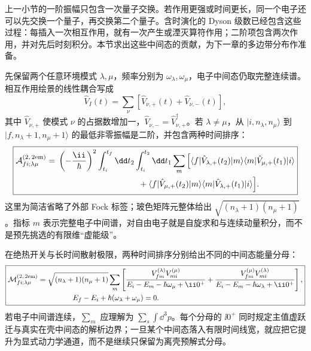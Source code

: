 上一小节的一阶振幅只包含一次量子交换。若作用更强或时间更长，同一个电子还可以先交换一个量子，再交换第二个量子。含时演化的 Dyson 级数已经包含这些过程：每插入一次相互作用，就有一次产生或湮灭算符作用；二阶项包含两次作用，并对先后时刻积分。本节求出这些中间态的贡献，为下一章的多边带分布作准备。

先保留两个任意环境模式 $\lambda,\mu$，频率分别为 $\omega_\lambda,\omega_\mu$，电子中间态仍取完整连续谱。相互作用绘景的线性耦合写成
\[
\hat V_I(t)=\sum_\nu[\hat V_{\nu,+}(t)+\hat V_{\nu,-}(t)],
\]
其中 $\hat V_{\nu,+}$ 使模式 $\nu$ 的占据数增加一，$\hat V_{\nu,-}=\hat V_{\nu,+}^\dagger$。若 $\lambda\neq\mu$，从 $|i,n_\lambda,n_\mu\rangle$ 到 $|f,n_\lambda+1,n_\mu+1\rangle$ 的最低非零振幅是二阶，并包含两种时间排序：
\begin{equation}
\boxed{
\begin{aligned}
\mathcal A_{fi;\lambda\mu}^{(2,\,2{\rm em})}
={}&\left(-\frac{\ii}{\hbar}\right)^2
\int_{t_i}^{t_f}\dd t_2\int_{t_i}^{t_2}\dd t_1\sum_m
\Big[
\langle f|\hat V_{\lambda,+}(t_2)|m\rangle
\langle m|\hat V_{\mu,+}(t_1)|i\rangle\\
&\hspace{34mm}+
\langle f|\hat V_{\mu,+}(t_2)|m\rangle
\langle m|\hat V_{\lambda,+}(t_1)|i\rangle
\Big].
\end{aligned}}
\label{eq:general_sequential_two_boson_dyson_amplitude}
\end{equation}
这里为简洁省略了外部 Fock 标签；玻色矩阵元整体给出
$\sqrt{(n_\lambda+1)(n_\mu+1)}$。指标 $m$ 表示完整电子中间谱，对自由电子就是自旋求和与连续动量积分，而不是预先挑选的有限维“虚能级”。

在绝热开关与长时间散射极限，两种时间排序分别给出不同的中间态能量分母：
\begin{equation}
\boxed{
\begin{aligned}
\mathcal M_{fi;\lambda\mu}^{(2,\,2{\rm em})}
={}&\sqrt{(n_\lambda+1)(n_\mu+1)}\sum_m
\left[
\frac{V^{(\lambda)}_{fm}V^{(\mu)}_{mi}}
{E_i-E_m-\hbar\omega_\mu+\ii0^+}
+
\frac{V^{(\mu)}_{fm}V^{(\lambda)}_{mi}}
{E_i-E_m-\hbar\omega_\lambda+\ii0^+}
\right],\\
&\hspace{12mm}E_f-E_i+\hbar(\omega_\lambda+\omega_\mu)=0.
\end{aligned}}
\label{eq:two_boson_resolvent_amplitude_general}
\end{equation}
若电子中间谱连续，$\sum_m$ 应理解为 $\sum_s\int\dd^3p$。每个分母的 $\ii0^+$ 同时规定主值虚跃迁与真实在壳中间态的解析边界；一旦某个中间态落入有限时间线宽，就应把它提升为显式动力学通道，而不是继续只保留为离壳预解式分母。

